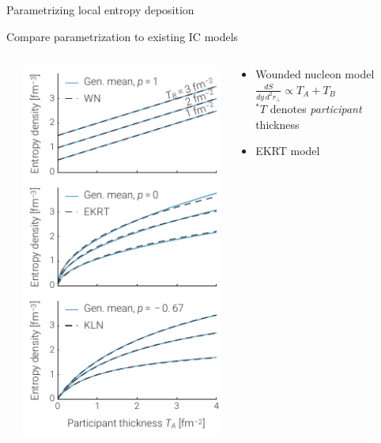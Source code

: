 \documentclass[xcolor=dvipsnames, aspectratio=169]{beamer}
\begin{document}
\begin{frame}{Parametrizing local entropy deposition}
\end{frame}


\begin{frame}[t]{Compare parametrization to existing IC models}
    \medskip
    \begin{columns}[T]
        \begin{column}{0.1\textwidth}
        \end{column}
        \begin{column}{0.3\textwidth}
            \includegraphics[height=0.8\textheight]{cgc_compare}
        \end{column}
        \begin{column}{0.6\textwidth}
            \begin{itemize}
                \itemsep2ex \small
                \item Wounded nucleon model \\[1em]
                      $\displaystyle \frac{dS}{dy\,d^2r_\perp} 
                      \propto T_A + T_B$ \\[1em]
                      {\scriptsize $^*T$ denotes \emph{participant} thickness} 
                \item EKRT model \; {\scriptsize \color{theme} 
}
\end{itemize}
\end{column}
\end{columns}
\end{frame}
\end{document}
